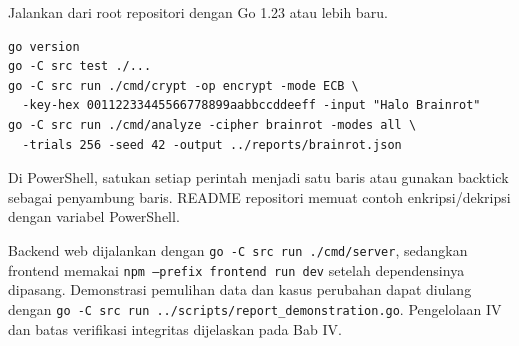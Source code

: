Jalankan dari root repositori dengan Go 1.23 atau lebih baru.
\begin{lstlisting}[language={},numbers=none,caption={Perintah verifikasi dan analisis.}]
go version
go -C src test ./...
go -C src run ./cmd/crypt -op encrypt -mode ECB \
  -key-hex 00112233445566778899aabbccddeeff -input "Halo Brainrot"
go -C src run ./cmd/analyze -cipher brainrot -modes all \
  -trials 256 -seed 42 -output ../reports/brainrot.json
\end{lstlisting}
Di PowerShell, satukan setiap perintah menjadi satu baris atau gunakan
backtick sebagai penyambung baris. README repositori memuat contoh
enkripsi/dekripsi dengan variabel PowerShell.

Backend web dijalankan dengan \texttt{go -C src run ./cmd/server},
sedangkan frontend memakai \texttt{npm --prefix frontend run dev}
setelah dependensinya dipasang. Demonstrasi pemulihan data dan kasus
perubahan dapat diulang dengan
\texttt{go -C src run ../scripts/report\_demonstration.go}.
Pengelolaan IV dan batas verifikasi integritas dijelaskan pada Bab IV.
